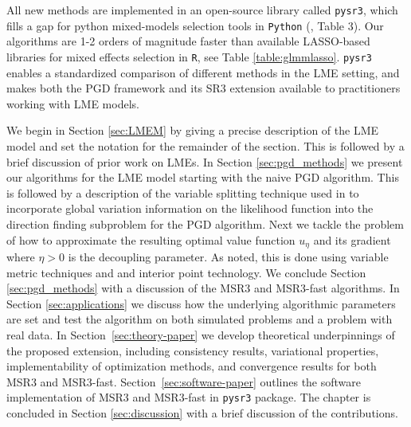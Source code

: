 All new methods are implemented in an open-source library called \texttt{pysr3}, which fills a gap for python mixed-models selection tools in \texttt{Python} (\cite{Buscemi2019Survey}, Table 3). Our algorithms are  1-2 orders of magnitude faster than available LASSO-based libraries for  mixed effects selection in \texttt{R},  see Table \ref{table:glmmlasso}. \texttt{pysr3} enables a standardized comparison of different methods in the LME setting, and makes both the PGD framework and its SR3 extension available to practitioners working with LME models. 

We begin in Section \ref{sec:LMEM} by giving a precise description of the LME
model and set the notation for the remainder of the section. 
This is followed by a brief discussion of prior work on LMEs.
In Section \ref{sec:pgd_methods} we present our algorithms for the LME model 
starting with the naive PGD algorithm. This is followed by a description of the 
variable splitting technique used in \cite{Zheng2019SR3} to incorporate global 
variation information on the likelihood function into the direction finding subproblem
for the PGD algorithm. 
Next we tackle the problem of how to approximate the 
resulting optimal value function $u_\eta$ and its gradient where $\eta>0$ is the 
decoupling parameter. As noted, this is done using variable metric techniques and 
and interior point technology. We conclude Section \ref{sec:pgd_methods} 
with a discussion of the
MSR3 and MSR3-fast algorithms. In Section \ref{sec:applications} we discuss how
the underlying algorithmic parameters are set and test the algorithm on both 
simulated problems and a problem with real data. In Section~\ref{sec:theory-paper} we develop theoretical underpinnings of the proposed extension, including consistency results, variational properties, implementability of optimization methods, and convergence results for both MSR3 and MSR3-fast. Section~\ref{sec:software-paper} outlines the software implementation of MSR3 and MSR3-fast in \texttt{pysr3} package. The chapter is concluded in Section \ref{sec:discussion} with a brief discussion of the contributions.


